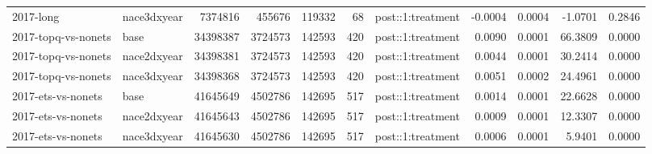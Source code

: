 \begin{table}[ht]
\begin{tabular}{llrrrrlrrrr}
  2017-long & nace3dxyear & 7374816 & 455676 & 119332 &    68 & post::1:treatment & -0.0004 & 0.0004 & -1.0701 & 0.2846 \\ 
  2017-topq-vs-nonets & base & 34398387 & 3724573 & 142593 &   420 & post::1:treatment & 0.0090 & 0.0001 & 66.3809 & 0.0000 \\ 
  2017-topq-vs-nonets & nace2dxyear & 34398381 & 3724573 & 142593 &   420 & post::1:treatment & 0.0044 & 0.0001 & 30.2414 & 0.0000 \\ 
  2017-topq-vs-nonets & nace3dxyear & 34398368 & 3724573 & 142593 &   420 & post::1:treatment & 0.0051 & 0.0002 & 24.4961 & 0.0000 \\ 
  2017-ets-vs-nonets & base & 41645649 & 4502786 & 142695 &   517 & post::1:treatment & 0.0014 & 0.0001 & 22.6628 & 0.0000 \\ 
  2017-ets-vs-nonets & nace2dxyear & 41645643 & 4502786 & 142695 &   517 & post::1:treatment & 0.0009 & 0.0001 & 12.3307 & 0.0000 \\ 
  2017-ets-vs-nonets & nace3dxyear & 41645630 & 4502786 & 142695 &   517 & post::1:treatment & 0.0006 & 0.0001 & 5.9401 & 0.0000 \\ 
   \bottomrule
\end{tabular}
\end{table}
